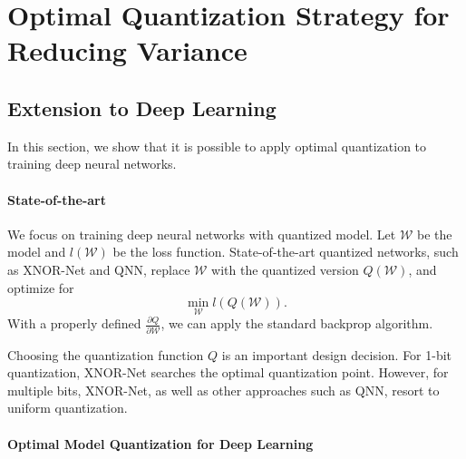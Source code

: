 \documentclass{article}
\begin{document}

%






\section{Optimal Quantization Strategy for Reducing Variance} \label{sec:optimal}

\vspace{-0.5em}





\vspace{-0.5em}
\subsection{Extension to Deep Learning}
\vspace{-0.5em}

In this section, we show that it is possible 
to apply optimal quantization to
training deep neural networks.

\vspace{-0.5em}
\paragraph*{State-of-the-art} We focus on
training deep neural networks with quantized
model. Let $\mathcal{W}$ be the model and 
$l(\mathcal{W})$ be the loss function. State-of-the-art quantized networks,
such as XNOR-Net and QNN, replace $\mathcal{W}$
with the quantized version $Q(\mathcal{W})$, and optimize
for
\[
\min_{\mathcal{W}} l(Q(\mathcal{W})).
\]
With a properly defined 
$\frac{\partial Q}{\partial{\mathcal{W}}}$, we can
apply the standard backprop 
algorithm.

\vspace{-0.5em}
Choosing the quantization function $Q$ is
an important design decision. For 1-bit quantization,
XNOR-Net searches the optimal quantization point. However, for multiple bits,
XNOR-Net, as well as other approaches such as QNN, resort
to uniform quantization.

\vspace{-0.5em}
\paragraph*{Optimal Model Quantization for Deep Learning}
\end{document}
